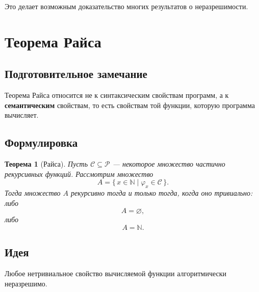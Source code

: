 \documentclass[12pt,a4paper]{article}
\newtheorem{theorem}{Теорема}
\begin{document}
Это делает возможным доказательство многих результатов о неразрешимости.

\section{Теорема Райса}

\subsection{Подготовительное замечание}
Теорема Райса относится не к синтаксическим свойствам программ, а к \textbf{семантическим} свойствам, то есть свойствам той функции, которую программа вычисляет.

\subsection{Формулировка}
\begin{theorem}[Райса]
Пусть $\mathcal C\subseteq \mathcal P$ --- некоторое множество частично рекурсивных функций. Рассмотрим множество
\[
A=\{\,x\in\mathbb N \mid \varphi_x \in \mathcal C\,\}.
\]
Тогда множество $A$ рекурсивно тогда и только тогда, когда оно тривиально: либо
\[
A=\varnothing,
\]
либо
\[
A=\mathbb N.
\]
\end{theorem}

\subsection{Идея}
Любое нетривиальное свойство вычисляемой функции алгоритмически неразрешимо.
\end{document}
